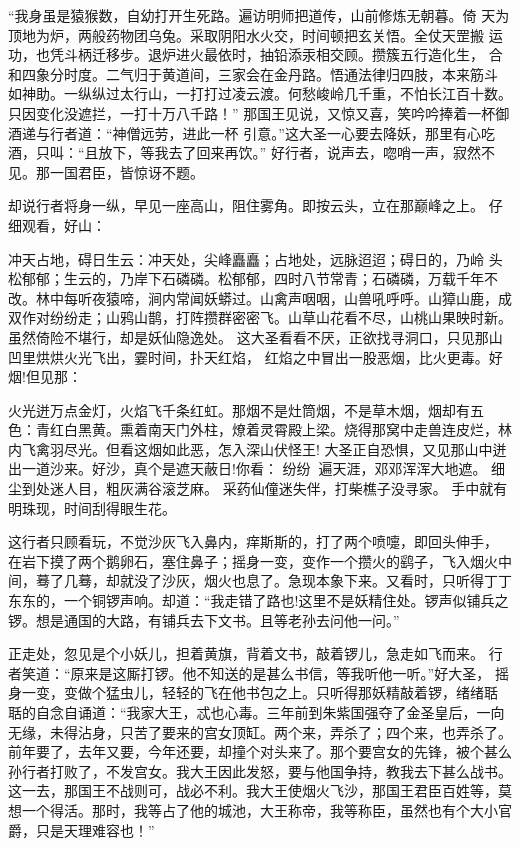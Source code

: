 “我身虽是猿猴数，自幼打开生死路。遍访明师把道传，山前修炼无朝暮。倚
天为顶地为炉，两般药物团乌兔。采取阴阳水火交，时间顿把玄关悟。全仗天罡搬
运功，也凭斗柄迁移步。退炉进火最依时，抽铅添汞相交顾。攒簇五行造化生，
合和四象分时度。二气归于黄道间，三家会在金丹路。悟通法律归四肢，本来筋斗
如神助。一纵纵过太行山，一打打过凌云渡。何愁峻岭几千重，不怕长江百十数。
只因变化没遮拦，一打十万八千路！”
那国王见说，又惊又喜，笑吟吟捧着一杯御酒递与行者道：“神僧远劳，进此一杯
引意。”这大圣一心要去降妖，那里有心吃酒，只叫：“且放下，等我去了回来再饮。”
好行者，说声去，唿哨一声，寂然不见。那一国君臣，皆惊讶不题。

却说行者将身一纵，早见一座高山，阻住雾角。即按云头，立在那巅峰之上。
仔细观看，好山：

冲天占地，碍日生云：冲天处，尖峰矗矗；占地处，远脉迢迢；碍日的，乃岭
头松郁郁；生云的，乃岸下石磷磷。松郁郁，四时八节常青；石磷磷，万载千年不
改。林中每听夜猿啼，涧内常闻妖蟒过。山禽声咽咽，山兽吼呼呼。山獐山鹿，成
双作对纷纷走；山鸦山鹊，打阵攒群密密飞。山草山花看不尽，山桃山果映时新。
虽然倚险不堪行，却是妖仙隐逸处。
这大圣看看不厌，正欲找寻洞口，只见那山凹里烘烘火光飞出，霎时间，扑天红焰，
红焰之中冒出一股恶烟，比火更毒。好烟!但见那：

火光迸万点金灯，火焰飞千条红虹。那烟不是灶筒烟，不是草木烟，烟却有五
色：青红白黑黄。熏着南天门外柱，燎着灵霄殿上梁。烧得那窝中走兽连皮烂，林
内飞禽羽尽光。但看这烟如此恶，怎入深山伏怪王!
大圣正自恐惧，又见那山中迸出一道沙来。好沙，真个是遮天蔽日!你看：
纷纷遍天涯，邓邓浑浑大地遮。
细尘到处迷人目，粗灰满谷滚芝麻。
采药仙僮迷失伴，打柴樵子没寻家。
手中就有明珠现，时间刮得眼生花。

这行者只顾看玩，不觉沙灰飞入鼻内，痒斯斯的，打了两个喷嚏，即回头伸手，
在岩下摸了两个鹅卵石，塞住鼻子；摇身一变，变作一个攒火的鹞子，飞入烟火中
间，蓦了几蓦，却就没了沙灰，烟火也息了。急现本象下来。又看时，只听得丁丁
东东的，一个铜锣声响。却道：“我走错了路也!这里不是妖精住处。锣声似铺兵之
锣。想是通国的大路，有铺兵去下文书。且等老孙去问他一问。”

正走处，忽见是个小妖儿，担着黄旗，背着文书，敲着锣儿，急走如飞而来。
行者笑道：“原来是这厮打锣。他不知送的是甚么书信，等我听他一听。”好大圣，
摇身一变，变做个猛虫儿，轻轻的飞在他书包之上。只听得那妖精敲着锣，绪绪聒
聒的自念自诵道：“我家大王，忒也心毒。三年前到朱紫国强夺了金圣皇后，一向
无缘，未得沾身，只苦了要来的宫女顶缸。两个来，弄杀了；四个来，也弄杀了。
前年要了，去年又要，今年还要，却撞个对头来了。那个要宫女的先锋，被个甚么
孙行者打败了，不发宫女。我大王因此发怒，要与他国争持，教我去下甚么战书。
这一去，那国王不战则可，战必不利。我大王使烟火飞沙，那国王君臣百姓等，莫
想一个得活。那时，我等占了他的城池，大王称帝，我等称臣，虽然也有个大小官
爵，只是天理难容也！”

